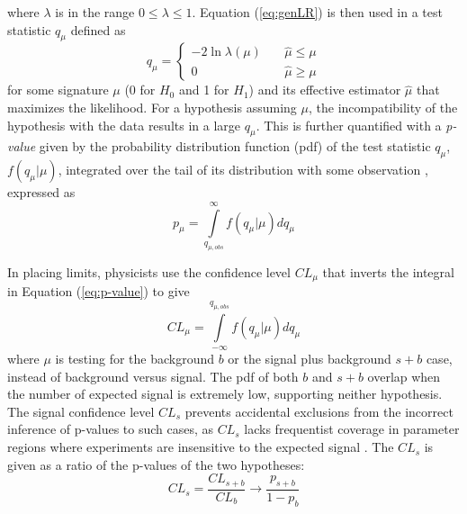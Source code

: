 where $\lambda$ is in the range $0 \leq \lambda \leq 1$. Equation (\ref{eq:genLR}) is then used in a test statistic $q_\mu$ defined as
\begin{equation}
    q_\mu = \left\{
        \begin{array}{ll}
            -2\ln \lambda(\mu) & \quad \hat{\mu} \leq \mu \\
            0 & \quad \hat{\mu} \geq \mu
        \end{array}
    \right.
\end{equation}
for some signature $\mu$ (0 for $H_0$ and 1 for $H_1$) and its effective estimator $\hat{\mu}$ that maximizes the likelihood. For a hypothesis assuming $\mu$, the incompatibility of the hypothesis with the data results in a large $q_\mu$. This is further quantified with a \textit{p-value} given by the probability distribution function (pdf) of the test statistic $q_\mu$, $f(q_\mu|\mu)$, integrated over the tail of its distribution with some observation \cite{cowan2011asymptotic}, expressed as \\
\begin{equation}
    p_\mu = \int\limits^\infty_{q_{\mu,obs}} f(q_\mu|\mu) dq_\mu
    \label{eq:p-value}
\end{equation}

In placing limits, physicists use the confidence level $CL_\mu$ that inverts the integral in Equation (\ref{eq:p-value}) to give
\begin{equation}
    CL_\mu = \int\limits_{-\infty}^{q_{\mu,obs}} f(q_\mu|\mu) dq_\mu
    \label{eq:CLmu}
\end{equation}
where $\mu$ is testing for the background $b$ or the signal plus background $s+b$ case, instead of background versus signal. The pdf of both $b$ and $s+b$ overlap when the number of expected signal is extremely low, supporting neither hypothesis.
The signal confidence level $CL_s$ prevents accidental exclusions from the incorrect inference of p-values to such cases, as $CL_s$ lacks frequentist coverage in parameter regions where experiments are insensitive to the expected signal \cite{LHCstats}. The $CL_s$ is given as a ratio of the p-values of the two hypotheses:
\begin{equation}
    CL_s = \frac{CL_{s+b}}{CL_b} \rightarrow \frac{p_{s+b}}{1-p_b}
    \label{eq:CLS}
\end{equation}


